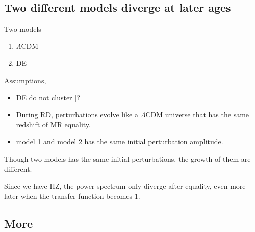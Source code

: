 \documentclass{article}
\begin{document}
\subsection{Two different models diverge at later ages}

Two models
\begin{enumerate}
\item $\Lambda$CDM
\item DE
\end{enumerate}



Assumptions,
\begin{itemize}
\item  DE do not cluster [?]
\item  During RD, perturbations evolve like a $\Lambda$CDM universe that has the same redshift of MR equality.
\item  model 1 and model 2 has the same initial perturbation amplitude.
\end{itemize}





Though two models has the same initial perturbations, the growth of them are different.

Since we have HZ, the power spectrum only diverge after equality, even more later when the transfer function becomes 1.






\subsection{More}
\end{document}
